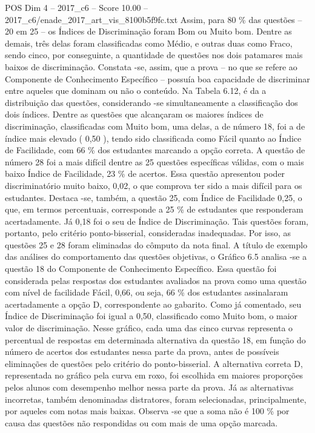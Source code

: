 \begin{textsample}{POS Dim 4 – 2017\_c6 – Score 10.00 – 2017\_c6/enade\_2017\_art\_vis\_8100b5f9fc.txt}
Assim, para 80 \% das questões – 20 em 25 – os Índices de Discriminação foram Bom ou Muito bom.
Dentre as demais, três delas foram classificadas como Médio, e outras duas como Fraco, sendo cinco, por conseguinte, a quantidade de questões nos dois patamares mais baixos de discriminação.
Constata -se, assim, que a prova – no que se refere ao Componente de Conhecimento Específico – possuía boa capacidade de discriminar entre aqueles que dominam ou não o conteúdo.
Na Tabela 6.12, é da a distribuição das questões, considerando -se simultaneamente a classificação dos dois índices.
Dentre as questões que alcançaram os maiores índices de discriminação, classificadas com Muito bom, uma delas, a de número 18, foi a de índice mais elevado ( 0,50 ), tendo sido classificada como Fácil quanto ao Índice de Facilidade, com 66 \% dos estudantes marcando a opção correta.
A questão de número 28 foi a mais difícil dentre as 25 questões específicas válidas, com o mais baixo Índice de Facilidade, 23 \% de acertos.
Essa questão apresentou poder discriminatório muito baixo, 0,02, o que comprova ter sido a mais difícil para os estudantes.
Destaca -se, também, a questão 25, com Índice de Facilidade 0,25, o que, em termos percentuais, corresponde a 25 \% de estudantes que responderam acertadamente.
Já 0,18 foi o seu de Índice de Discriminação.
Tais questões foram, portanto, pelo critério ponto-bisserial, consideradas inadequadas.
Por isso, as questões 25 e 28 foram eliminadas do cômputo da nota final.
A título de exemplo das análises do comportamento das questões objetivas, o Gráfico 6.5 analisa -se a questão 18 do Componente de Conhecimento Específico.
Essa questão foi considerada pelas respostas dos estudantes avaliados na prova como uma questão com nível de facilidade Fácil, 0,66, ou seja, 66 \% dos estudantes assinalaram acertadamente a opção D, correspondente ao gabarito.
Como já comentado, seu Índice de Discriminação foi igual a 0,50, classificado como Muito bom, o maior valor de discriminação.
Nesse gráfico, cada uma das cinco curvas representa o percentual de respostas em determinada alternativa da questão 18, em função do número de acertos dos estudantes nessa parte da prova, antes de possíveis eliminações de questões pelo critério do ponto-bisserial.
A alternativa correta D, representada no gráfico pela curva em roxo, foi escolhida em maiores proporções pelos alunos com desempenho melhor nessa parte da prova.
Já as alternativas incorretas, também denominadas distratores, foram selecionadas, principalmente, por aqueles com notas mais baixas.
Observa -se que a soma não é 100 \% por causa das questões não respondidas ou com mais de uma opção marcada.

\end{textsample}
